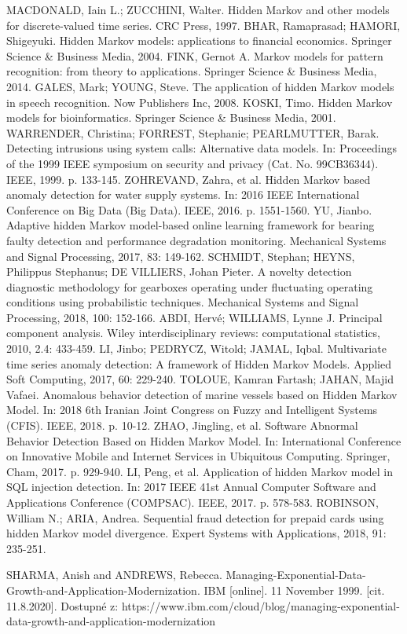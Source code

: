 \documentclass[11pt,twoside,openright]{report}
\begin{document}
\begin{thebibliography}{L}
MACDONALD, Iain L.; ZUCCHINI, Walter. Hidden Markov and other models for discrete-valued time series. CRC Press, 1997.
BHAR, Ramaprasad; HAMORI, Shigeyuki. Hidden Markov models: applications to financial economics. Springer Science \& Business Media, 2004.
FINK, Gernot A. Markov models for pattern recognition: from theory to applications. Springer Science \& Business Media, 2014.
GALES, Mark; YOUNG, Steve. The application of hidden Markov models in speech recognition. Now Publishers Inc, 2008.
KOSKI, Timo. Hidden Markov models for bioinformatics. Springer Science \& Business Media, 2001.
WARRENDER, Christina; FORREST, Stephanie; PEARLMUTTER, Barak. Detecting intrusions using system calls: Alternative data models. In: Proceedings of the 1999 IEEE symposium on security and privacy (Cat. No. 99CB36344). IEEE, 1999. p. 133-145.
ZOHREVAND, Zahra, et al. Hidden Markov based anomaly detection for water supply systems. In: 2016 IEEE International Conference on Big Data (Big Data). IEEE, 2016. p. 1551-1560.
YU, Jianbo. Adaptive hidden Markov model-based online learning framework for bearing faulty detection and performance degradation monitoring. Mechanical Systems and Signal Processing, 2017, 83: 149-162.
SCHMIDT, Stephan; HEYNS, Philippus Stephanus; DE VILLIERS, Johan Pieter. A novelty detection diagnostic methodology for gearboxes operating under fluctuating operating conditions using probabilistic techniques. Mechanical Systems and Signal Processing, 2018, 100: 152-166.
ABDI, Hervé; WILLIAMS, Lynne J. Principal component analysis. Wiley interdisciplinary reviews: computational statistics, 2010, 2.4: 433-459.
LI, Jinbo; PEDRYCZ, Witold; JAMAL, Iqbal. Multivariate time series anomaly detection: A framework of Hidden Markov Models. Applied Soft Computing, 2017, 60: 229-240.
TOLOUE, Kamran Fartash; JAHAN, Majid Vafaei. Anomalous behavior detection of marine vessels based on Hidden Markov Model. In: 2018 6th Iranian Joint Congress on Fuzzy and Intelligent Systems (CFIS). IEEE, 2018. p. 10-12.
ZHAO, Jingling, et al. Software Abnormal Behavior Detection Based on Hidden Markov Model. In: International Conference on Innovative Mobile and Internet Services in Ubiquitous Computing. Springer, Cham, 2017. p. 929-940.
LI, Peng, et al. Application of hidden Markov model in SQL injection detection. In: 2017 IEEE 41st Annual Computer Software and Applications Conference (COMPSAC). IEEE, 2017. p. 578-583.
ROBINSON, William N.; ARIA, Andrea. Sequential fraud detection for prepaid cards using hidden Markov model divergence. Expert Systems with Applications, 2018, 91: 235-251.

SHARMA, Anish and ANDREWS, Rebecca. Managing-Exponential-Data-Growth-and-Application-Modernization. IBM [online]. 11 November 1999. [cit. 11.8.2020]. Dostupné z: https://www.ibm.com/cloud/blog/managing-exponential-data-growth-and-application-modernization 
\end{thebibliography}
\end{document}
